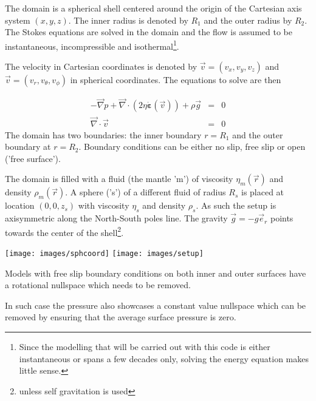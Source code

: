 

The domain is a spherical shell centered around the origin of the Cartesian 
axis system $(x,y,z)$. 
The inner radius is denoted by $R_1$ and the outer radius by $R_2$.
The Stokes equations are solved in the domain and the flow is assumed 
to be instantaneous, incompressible and isothermal\footnote{Since 
the modelling that will be carried out with this code is either 
instantaneous or spans a few decades only, solving the energy equation 
makes little sense.}.

The velocity in Cartesian coordinates is denoted by $\vec{v}=(v_x,v_y,v_z)$ and 
$\vec{v}=(v_r,v_\theta,v_\phi)$ in spherical coordinates. 
The equations to solve are then

\begin{eqnarray}
- \vec\nabla p + \vec\nabla \cdot (2 \eta \dot{\bm \varepsilon}(\vec v))  + \rho \vec{g} &=& 0 \\
\vec\nabla \cdot \vec{v} &=& 0
\end{eqnarray}
The domain has two boundaries: the inner boundary $r=R_1$ and the outer boundary at $r=R_2$.
Boundary conditions can be either no slip, free slip or open ('free surface').

The domain is filled with a fluid (the mantle 'm') of viscosity $\eta_m(\vec{r})$ 
and density $\rho_m(\vec{r})$.
A sphere ('s') of a different fluid of radius $R_s$ is placed at location $(0,0,z_s)$ with 
viscosity $\eta_s$ and density $\rho_s$. As such the setup is 
axisymmetric along the North-South poles line.
The gravity $\vec{g}=-g \vec{e}_r$ points towards the center of the shell\footnote{unless 
self gravitation is used}.

\begin{center}
\texttt{[image: images/sphcoord]}
\texttt{[image: images/setup]}
\end{center}

Models with free slip boundary conditions on both inner and outer surfaces have a rotational nullspace which needs to be removed. 

In such case the pressure also showcases a constant value nullspace which can be removed by ensuring that the average surface pressure is zero.
